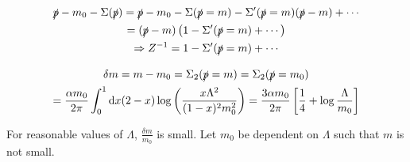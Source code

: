 \documentclass[]{scrartcl}
\begin{document}
\begin{gather}
	\slashed p - m_0 - \Sigma(\slashed p) = \slashed p - m_0 - \Sigma(\slashed p = m) - \Sigma'(\slashed p = m) (\slashed p -m) + \cdots\\
	= (\slashed p - m)\left(1 - \Sigma'(\slashed p =m) + \cdots\right)\\
	\Rightarrow Z^{-1} = 1 - \Sigma'(\slashed p = m) + \cdots
\end{gather}

\begin{gather}
	\delta m = m - m_0 = \Sigma_2(\slashed p =  m) = \Sigma_2(\slashed p = m_0)\\
	= \frac{\alpha m_0}{2\pi}\int_0^1 \text dx (2-x)\log\left(\frac{x\Lambda^2}{(1-x)^2 m_0^2}\right) = \frac{3\alpha m_0}{2\pi}\left[\frac{1}{4} + \log\frac{\Lambda}{m_0}\right]
\end{gather}

For reasonable values of $\Lambda$, $\frac{\delta m}{m_0}$ is small. Let $m_0$ be dependent on $\Lambda$ such that $m$ is not small.
\end{document}
